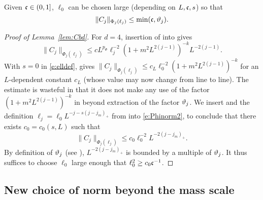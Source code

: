 \begin{lemma}
\label{lem:Cbd}
Given $\mathfrak{c} \in (0, 1]$, $\ell_0$ can be chosen large (depending on $L,\mathfrak{c},s$)
so that
\begin{equation}
\lbeq{Cbd}
\|C_j\|_{\Phi_{j}(\ell_j)} \leq \min(\ellconst, \chicCov_j).
\end{equation}
\end{lemma}

\begin{proof}[Proof of Lemma~\ref{lem:Cbd}]
For $d=4$, insertion of  into  gives
\begin{equation}
    \label{e:Phinorm2}
    \|C_j\|_{\Phi_{j}(\ell_j)}
    \le
    c
    L^{p_\Phi}
    \ell_j^{-2}(1+m^2L^{2(j-1)})^{-k}
    L^{-2(j-1)}.
\end{equation}
With $s=0$ in \eqref{e:elldef},  gives
$\|C_j\|_{\Phi_{j}(\ell_j)} \le c_L \ell_0^{-2} (1+m^2L^{2(j-1)})^{-k}$
for an $L$-dependent constant $c_L$ (whose value may now change from line to line).
The estimate \cite[\eqref{IE-e:CLbd}]{BS-rg-IE}
is wasteful in that it does not make any use of the factor
$(1+m^2L^{2(j-1)})^{-k}$ in  beyond extraction of the factor $\vartheta_j$.
We insert  and the definition $\ell_j=\ell_0 L^{-j-s(j-j_m)_+}$ from
 into
\eqref{e:Phinorm2}, to conclude that there exists $c_0 = c_0(s, L)$ such that
\begin{equation}
    \|C_j\|_{\Phi_{j}(\ell_j)} \leq c_0 \ell_0^{-2} L^{-2(j - j_m)_+}
    .
\end{equation}
By definition of $\vartheta_j$ (see \cite[Section~\ref{IE-sec:frp}]{BS-rg-IE}),
$L^{-2(j - j_m)_+}$ is bounded by a multiple of $\vartheta_j$.
It thus suffices to choose $\ell_0$ large enough that
$\ell_0^2 \ge c_0 \mathfrak{c}^{-1}$.
\end{proof}


\subsection{New choice of norm beyond the mass scale}
\label{sec:newnorm}

